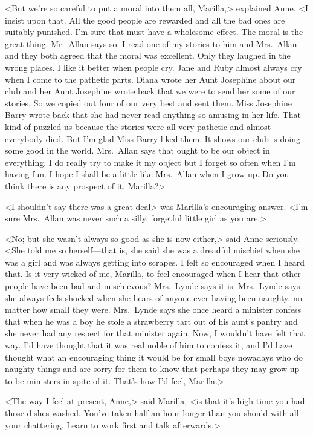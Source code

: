 <But we're so careful to put a moral into them all, Marilla,> explained Anne. <I insist upon that. All the good people are rewarded and all the bad ones are suitably punished. I'm sure that must have a wholesome effect. The moral is the great thing. Mr.~Allan says so. I read one of my stories to him and Mrs.~Allan and they both agreed that the moral was excellent. Only they laughed in the wrong places. I like it better when people cry. Jane and Ruby almost always cry when I come to the pathetic parts. Diana wrote her Aunt Josephine about our club and her Aunt Josephine wrote back that we were to send her some of our stories. So we copied out four of our very best and sent them. Miss Josephine Barry wrote back that she had never read anything so amusing in her life. That kind of puzzled us because the stories were all very pathetic and almost everybody died. But I'm glad Miss Barry liked them. It shows our club is doing some good in the world. Mrs.~Allan says that ought to be our object in everything. I do really try to make it my object but I forget so often when I'm having fun. I hope I shall be a little like Mrs.~Allan when I grow up. Do you think there is any prospect of it, Marilla?>

<I shouldn't say there was a great deal> was Marilla's encouraging answer. <I'm sure Mrs.~Allan was never such a silly, forgetful little girl as you are.>

<No; but she wasn't always so good as she is now either,> said Anne seriously. <She told me so herself—that is, she said she was a dreadful mischief when she was a girl and was always getting into scrapes. I felt so encouraged when I heard that. Is it very wicked of me, Marilla, to feel encouraged when I hear that other people have been bad and mischievous? Mrs.~Lynde says it is. Mrs.~Lynde says she always feels shocked when she hears of anyone ever having been naughty, no matter how small they were. Mrs.~Lynde says she once heard a minister confess that when he was a boy he stole a strawberry tart out of his aunt's pantry and she never had any respect for that minister again. Now, I wouldn't have felt that way. I'd have thought that it was real noble of him to confess it, and I'd have thought what an encouraging thing it would be for small boys nowadays who do naughty things and are sorry for them to know that perhaps they may grow up to be ministers in spite of it. That's how I'd feel, Marilla.>

<The way I feel at present, Anne,> said Marilla, <is that it's high time you had those dishes washed. You've taken half an hour longer than you should with all your chattering. Learn to work first and talk afterwards.>